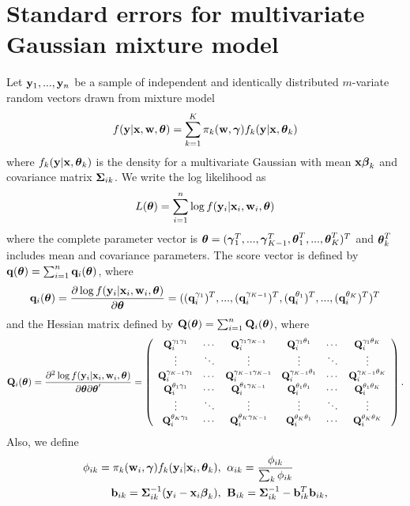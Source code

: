 \chapter{Standard errors for multivariate Gaussian mixture model}\label{append:1}

Let $\mathbf y_{1},...,\mathbf y_{n}$ be a sample of independent and identically distributed  $m$-variate random vectors drawn from mixture model
$$f(\mathbf y|\mathbf x, \mathbf w, \boldsymbol\theta) = \sum^{K}_{k=1}\pi_{k}(\mathbf w, \boldsymbol\gamma)f_{k}(\mathbf y|\mathbf x, \boldsymbol \theta_{k})$$
where $f_{k}(\mathbf y|\mathbf x, \boldsymbol \theta_{k})$ is the density for a multivariate Gaussian with mean $\mathbf x\boldsymbol\beta_{k}$ and covariance matrix $\boldsymbol\Sigma_{ik}$. We write the log likelihood as
$$L(\boldsymbol\theta)=\sum^{n}_{i=1}\log f(\mathbf y_{i}|\mathbf x_{i},\mathbf w_{i},\boldsymbol\theta)$$
where the complete parameter vector is $\boldsymbol\theta=(\boldsymbol\gamma_{1}^{T},...,\boldsymbol\gamma_{K-1}^{T},\boldsymbol\theta^{T}_{1},...,\boldsymbol\theta^{T}_{K})^{T}$ and $\boldsymbol\theta_{k}^{T}$ includes mean and covariance parameters. The score vector is defined by $\mathbf q(\boldsymbol\theta)=\sum_{i=1}^{n}\mathbf q_{i}(\boldsymbol \theta)$, where
$$\mathbf q_{i}(\boldsymbol\theta)=\frac{\partial \log f(\mathbf y_{i}|\mathbf x_{i},\mathbf w_{i},\boldsymbol\theta)}{\partial \boldsymbol\theta}=((\mathbf q^{\gamma_{1}}_{i})^{T},...,(\mathbf q^{\gamma_{K-1}}_{i})^{T},(\mathbf q^{\theta_{1}}_{i})^{T},...,(\mathbf q^{\theta_{K}}_{i})^{T})^{T}$$
and the Hessian matrix defined by $\mathbf Q(\boldsymbol\theta)=\sum_{i=1}^{n}\mathbf Q_{i}(\boldsymbol\theta)$, where
$$ \mathbf Q_{i}(\boldsymbol\theta)=\frac{\partial^{2} \log f(\mathbf y_{i}|\mathbf x_{i},\mathbf w_{i},\boldsymbol\theta)}{\partial \boldsymbol\theta\partial \boldsymbol\theta'}=\left(\begin{array}{cccccc} \mathbf Q^{\gamma_{1}\gamma_{1}}_{i}&\cdots&\mathbf Q^{\gamma_{1}\gamma_{K-1}}_{i}&\mathbf Q^{\gamma_{1}\theta_{1}}_{i}&\cdots&\mathbf Q^{\gamma_{1}\theta_{K}}_{i}\\
\vdots&\ddots&\vdots&\vdots&\ddots&\vdots\\
\mathbf Q^{\gamma_{K-1}\gamma_{1}}_{i}&\cdots&\mathbf Q^{\gamma_{K-1}\gamma_{K-1}}_{i}&\mathbf Q^{\gamma_{K-1}\theta_{1}}_{i}&\cdots&\mathbf Q^{\gamma_{K-1}\theta_{K}}_{i}\\
\mathbf Q^{\theta_{1}\gamma_{1}}_{i}&\cdots&\mathbf Q^{\theta_{1}\gamma_{K-1}}_{i}&\mathbf Q^{\theta_{1}\theta_{1}}_{i}&\cdots&\mathbf Q^{\theta_{1}\theta_{K}}_{i}\\
\vdots&\ddots&\vdots&\vdots&\ddots&\vdots\\
\mathbf Q^{\theta_{K}\gamma_{1}}_{i}&\cdots&\mathbf Q^{\theta_{K}\gamma_{K-1}}_{i}&\mathbf Q^{\theta_{K}\theta_{1}}_{i}&\cdots&\mathbf Q^{\theta_{K}\theta_{K}}_{i}\\
\end{array} \right).$$
Also, we define
\begin{align}
\phi_{ik}=\pi_{k}(\mathbf w_{i},\boldsymbol\gamma)f_{k}(\mathbf y_{i}|\mathbf x_{i},\boldsymbol\theta_{k}),&\;\; \alpha_{ik}=\frac{\phi_{ik}}{\sum_{k}\phi_{ik}}\label{phi}\\
\mathbf b_{ik}=\boldsymbol\Sigma_{ik}^{-1}(\mathbf y_{i}-\mathbf x_{i}\boldsymbol\beta_{k}),&\;\; \mathbf B_{ik}=\boldsymbol\Sigma_{ik}^{-1}-\mathbf b^{T}_{ik}\mathbf b_{ik},\label{bs2}
\end{align}

